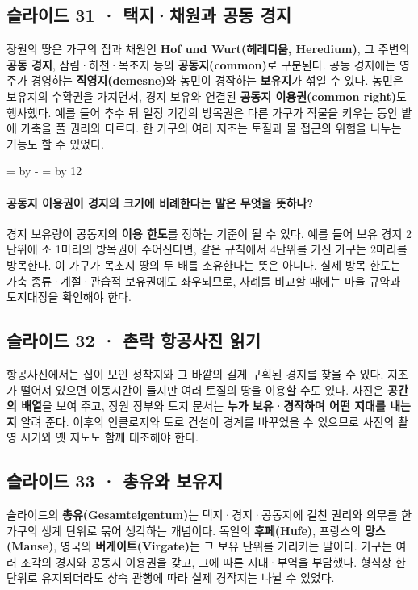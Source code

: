 \documentclass[10pt,a4paper]{article}
\newcommand{\ReserveQuestionSpace}{%
  \par\begingroup
  \dimen0=\pagegoal \advance\dimen0 by -\pagetotal
  \dimen2=\baselineskip \multiply\dimen2 by 12
  \ifdim\dimen0<\dimen2 \newpage\fi
  \endgroup}
\begin{document}
\subsection{슬라이드 31 · 택지·채원과 공동 경지}
장원의 땅은 가구의 집과 채원인 \textbf{Hof und Wurt(헤레디움, Heredium)}, 그 주변의 \textbf{공동 경지}, 삼림·하천·목초지 등의 \textbf{공동지(common)}로 구분된다. 공동 경지에는 영주가 경영하는 \textbf{직영지(demesne)}와 농민이 경작하는 \textbf{보유지}가 섞일 수 있다. 농민은 보유지의 수확권을 가지면서, 경지 보유와 연결된 \textbf{공동지 이용권(common right)}도 행사했다. 예를 들어 추수 뒤 일정 기간의 방목권은 다른 가구가 작물을 키우는 동안 밭에 가축을 풀 권리와 다르다. 한 가구의 여러 지조는 토질과 물 접근의 위험을 나누는 기능도 할 수 있었다.\par

\ReserveQuestionSpace
\paragraph{공동지 이용권이 경지의 크기에 비례한다는 말은 무엇을 뜻하나?}
경지 보유량이 공동지의 \textbf{이용 한도}를 정하는 기준이 될 수 있다. 예를 들어 보유 경지 2단위에 소 1마리의 방목권이 주어진다면, 같은 규칙에서 4단위를 가진 가구는 2마리를 방목한다. 이 가구가 목초지 땅의 두 배를 소유한다는 뜻은 아니다. 실제 방목 한도는 가축 종류·계절·관습적 보유권에도 좌우되므로, 사례를 비교할 때에는 마을 규약과 토지대장을 확인해야 한다.\par

\subsection{슬라이드 32 · 촌락 항공사진 읽기}
항공사진에서는 집이 모인 정착지와 그 바깥의 길게 구획된 경지를 찾을 수 있다. 지조가 떨어져 있으면 이동시간이 들지만 여러 토질의 땅을 이용할 수도 있다. 사진은 \textbf{공간의 배열}을 보여 주고, 장원 장부와 토지 문서는 \textbf{누가 보유·경작하며 어떤 지대를 내는지} 알려 준다. 이후의 인클로저와 도로 건설이 경계를 바꾸었을 수 있으므로 사진의 촬영 시기와 옛 지도도 함께 대조해야 한다.\par

\subsection{슬라이드 33 · 총유와 보유지}
슬라이드의 \textbf{총유(Gesamteigentum)}는 택지·경지·공동지에 걸친 권리와 의무를 한 가구의 생계 단위로 묶어 생각하는 개념이다. 독일의 \textbf{후페(Hufe)}, 프랑스의 \textbf{망스(Manse)}, 영국의 \textbf{버게이트(Virgate)}는 그 보유 단위를 가리키는 말이다. 가구는 여러 조각의 경지와 공동지 이용권을 갖고, 그에 따른 지대·부역을 부담했다. 형식상 한 단위로 유지되더라도 상속 관행에 따라 실제 경작지는 나뉠 수 있었다.\par
\end{document}
